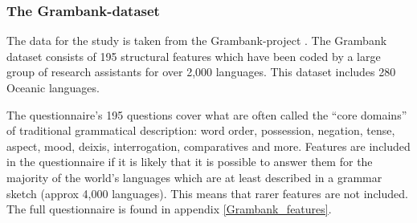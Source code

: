 \documentclass[a4paper,10pt]{article} %
\begin{document}
\subsubsection{The Grambank-dataset}
\label{asr:sec:GBcoverage}

The data for the study is taken from the Grambank-project \citep{grambankwebsite}. The Grambank dataset consists of 195 structural features which have been coded by a large group of research assistants for over 2,000 languages. This dataset includes 280 Oceanic languages. 


 


The questionnaire's 195 questions cover what are often called the ``core domains'' of traditional grammatical description: word order, possession, negation, tense, aspect, mood, deixis, interrogation, comparatives and more. Features are included in the questionnaire if it is likely that it is possible to answer them for the majority of the world's languages which are at least described in a grammar sketch (approx 4,000 languages). This means that rarer features are not included. The full questionnaire is found in appendix \ref{Grambank_features}. 
\end{document}
